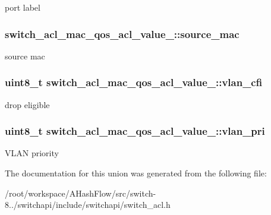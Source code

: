 port label \hypertarget{unionswitch__acl__mac__qos__acl__value___a7b7f6d9ee00436e5ff87e441a53f93b9}{
\subsubsection[{source\+\_\+mac}]{ switch\+\_\+acl\+\_\+mac\+\_\+qos\+\_\+acl\+\_\+value\+\_\+\+::source\+\_\+mac}}\label{unionswitch__acl__mac__qos__acl__value___a7b7f6d9ee00436e5ff87e441a53f93b9}
source mac \hypertarget{unionswitch__acl__mac__qos__acl__value___a03d5c55bd7ffecaafbb379be16319c9c}{
\subsubsection[{vlan\+\_\+cfi}]{\setlength{\rightskip}{0pt plus 5cm}uint8\+\_\+t switch\+\_\+acl\+\_\+mac\+\_\+qos\+\_\+acl\+\_\+value\+\_\+\+::vlan\+\_\+cfi}}\label{unionswitch__acl__mac__qos__acl__value___a03d5c55bd7ffecaafbb379be16319c9c}
drop eligible \hypertarget{unionswitch__acl__mac__qos__acl__value___a1fb10d16c194d6b9c4e1cb5b01a9af9a}{
\subsubsection[{vlan\+\_\+pri}]{\setlength{\rightskip}{0pt plus 5cm}uint8\+\_\+t switch\+\_\+acl\+\_\+mac\+\_\+qos\+\_\+acl\+\_\+value\+\_\+\+::vlan\+\_\+pri}}\label{unionswitch__acl__mac__qos__acl__value___a1fb10d16c194d6b9c4e1cb5b01a9af9a}
V\+L\+A\+N priority 

The documentation for this union was generated from the following file\+:\begin{DoxyCompactItemize}
\item 
/root/workspace/\+A\+Hash\+Flow/src/switch-\/8../switchapi/include/switchapi/switch\+\_\+acl.\+h\end{DoxyCompactItemize}
